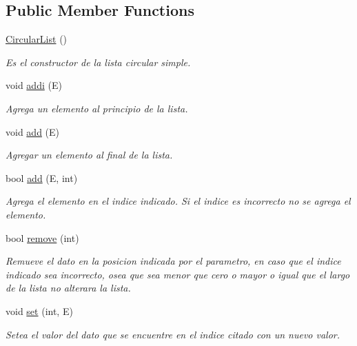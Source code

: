 \subsection*{Public Member Functions}
\begin{DoxyCompactItemize}
\item 
\hypertarget{class_circular_list_aad23571a808ede6fc0432dca645ab2ca}{\hyperlink{class_circular_list_aad23571a808ede6fc0432dca645ab2ca}{Circular\-List} ()}\label{class_circular_list_aad23571a808ede6fc0432dca645ab2ca}

\begin{DoxyCompactList}\small\item\em Es el constructor de la lista circular simple. \end{DoxyCompactList}\item 
void \hyperlink{class_circular_list_a275c75e142e791de9a1a00691af56a73}{addi} (E)
\begin{DoxyCompactList}\small\item\em Agrega un elemento al principio de la lista. \end{DoxyCompactList}\item 
void \hyperlink{class_circular_list_a892b493309f36fb083fdd257388cfa36}{add} (E)
\begin{DoxyCompactList}\small\item\em Agregar un elemento al final de la lista. \end{DoxyCompactList}\item 
bool \hyperlink{class_circular_list_af184d3ac2e3bba683a44a6cc19392b12}{add} (E, int)
\begin{DoxyCompactList}\small\item\em Agrega el elemento en el indice indicado. Si el indice es incorrecto no se agrega el elemento. \end{DoxyCompactList}\item 
bool \hyperlink{class_circular_list_a4a6acfd818a0ae9055957ec80258c60a}{remove} (int)
\begin{DoxyCompactList}\small\item\em Remueve el dato en la posicion indicada por el parametro, en caso que el indice indicado sea incorrecto, osea que sea menor que cero o mayor o igual que el largo de la lista no alterara la lista. \end{DoxyCompactList}\item 
void \hyperlink{class_circular_list_aa54489e11ad76bf929f92b1dce97a3a3}{set} (int, E)
\begin{DoxyCompactList}\small\item\em Setea el valor del dato que se encuentre en el indice citado con un nuevo valor. \end{DoxyCompactList}\item 

\end{DoxyCompactItemize}
